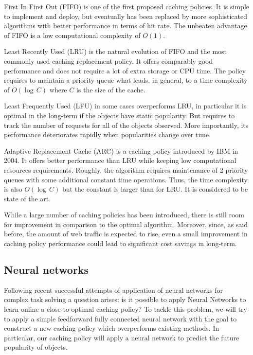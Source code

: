 First In First Out (FIFO) is one of the first proposed caching policies. It is simple to implement and deploy, but eventually has been replaced by more sophisticated algorithms with better performance in terms of hit rate. The unbeaten advantage of FIFO is a low computational complexity of $ O(1) $.

Least Recently Used (LRU) is the natural evolution of FIFO and the most commonly used caching replacement policy. It offers comparably good performance and does not require a lot of extra storage or CPU time. The policy requires to maintain a priority queue what leads, in general, to a time complexity of $ O(\log\,C) $ where $C$ is the size of the cache.

Least Frequently Used (LFU) in some cases overperforms LRU, in particular it is optimal in the long-term if the objects have static popularity. But requires to track the number of requests for all of the objects observed. More importantly, its performance deteriorates rapidly when popularities change over time.

Adaptive Replacement Cache (ARC) \cite{3} is a caching policy introduced by IBM in 2004. It offers better performance than LRU while keeping low computational resources requirements. Roughly, the algorithm requires maintenance of 2 priority queues with some additional constant time operations. Thus, the time complexity is also $ O(\log\,C) $ but the constant is larger than for LRU. It is considered to be state of the art.

While a large number of caching policies has been introduced, there is still room for improvement in comparison to the optimal algorithm. Moreover, since, as said before, the amount of web traffic is expected to rise, even a small improvement in caching policy performance could lead to significant cost savings in long-term.

\subsection{Neural networks} \label{neural_networks_intro}

Following recent successful attempts of application of neural networks \cite{6} for complex task solving \cite{7,8,9} a question arises: is it possible to apply Neural Networks to learn online a close-to-optimal caching policy? To tackle this problem, we will try to apply a simple feedforward fully connected neural network with the goal to construct a new caching policy which overperforms existing methods. In particular, our caching policy will apply a neural network to predict the future popularity of objects.

